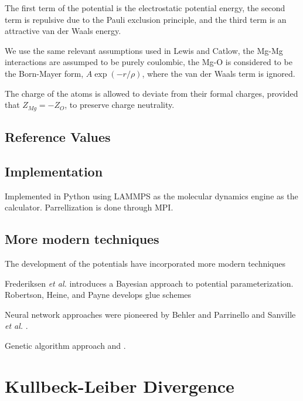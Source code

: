 The first term of the potential is the electrostatic potential energy, the second term is repulsive due to the Pauli exclusion principle, and the third term is an attractive van der Waals energy.

We use the same relevant assumptions used in Lewis and Catlow\cite{lewis1985_pot_buck_oxides}, the Mg-Mg interactions are assumped to be purely coulombic, the Mg-O is considered to be the Born-Mayer form, $A \exp(-r/\rho)$, where the van der Waals term is ignored.

The charge of the atoms is allowed to deviate from their formal charges, provided that $Z_{Mg} = - Z_{O}$, to preserve charge neutrality.
\subsection{Reference Values}

\subsection{Implementation}
Implemented in Python using LAMMPS as the molecular dynamics engine as the calculator.  Parrellization is done through MPI.

\subsection{More modern techniques}
The development of the potentials have incorporated more modern techniques

Frederiksen \emph{et al.} \cite{fredericksen2004_bayesian_fitting} introduces a Bayesian approach to potential parameterization.
Robertson, Heine, and Payne \cite{robertson1993_glue_schemes} develops glue schemes

Neural network approaches were pioneered by Behler and Parrinello \cite{behler2007_NN_potdev} and Sanville \emph{et al.} \cite{sanville2008_NN_potdev_si}.

Genetic algorithm approach\cite{marques2008_ga_potdev} and \cite{hunger1998_ga_potdev}.
\section{Kullbeck-Leiber Divergence}

